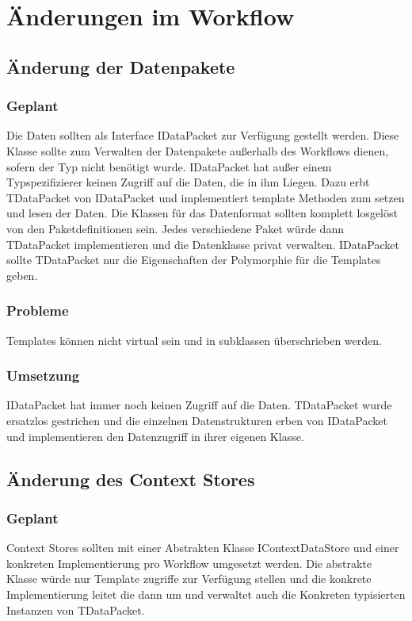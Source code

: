 \section{Änderungen im Workflow}
\subsection{Änderung der Datenpakete}
\subsubsection{Geplant}
Die Daten sollten als Interface IDataPacket zur Verfügung gestellt werden. Diese Klasse sollte zum Verwalten der Datenpakete außerhalb des Workflows dienen, sofern der Typ nicht benötigt wurde. IDataPacket hat außer einem Typspezifizierer keinen Zugriff auf die Daten, die in ihm Liegen. Dazu erbt TDataPacket von IDataPacket und implementiert template Methoden zum setzen und lesen der Daten. Die Klassen für das Datenformat sollten komplett losgelöst von den Paketdefinitionen sein. Jedes verschiedene Paket würde dann TDataPacket implementieren und die Datenklasse privat verwalten. IDataPacket sollte TDataPacket nur die Eigenschaften der Polymorphie für die Templates geben.
\subsubsection{Probleme}
Templates können nicht virtual sein und in subklassen überschrieben werden.
\subsubsection{Umsetzung}
IDataPacket hat immer noch keinen Zugriff auf die Daten. TDataPacket wurde ersatzlos gestrichen und die einzelnen Datenstrukturen erben von IDataPacket und implementieren den Datenzugriff in ihrer eigenen Klasse.
\subsection{Änderung des Context Stores}
\subsubsection{Geplant}
Context Stores sollten mit einer Abstrakten Klasse IContextDataStore und einer konkreten Implementierung pro Workflow umgesetzt werden. Die abstrakte Klasse würde nur Template zugriffe zur Verfügung stellen und die konkrete Implementierung leitet die dann um und verwaltet auch die Konkreten typisierten Instanzen von TDataPacket.
